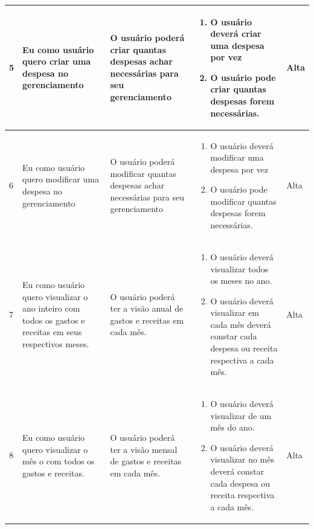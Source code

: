 \begin{longtable}[h!]{ | M{0.5cm} | T{2.7cm} | T{2.7cm} | T{4cm} | l | }
    5 & Eu como usuário quero criar uma despesa no gerenciamento & O usuário poderá criar quantas despesas achar necessárias para seu gerenciamento & \begin{enumerate}
        \item O usuário deverá criar uma despesa por vez
        \item O usuário pode criar quantas despesas forem necessárias.
    \end{enumerate} & Alta \\ \hline

    6 & Eu como usuário quero modificar uma despesa no gerenciamento & O usuário poderá modificar quantas despesas achar necessárias para seu gerenciamento & \begin{enumerate}
        \item O usuário deverá modificar uma despesa por vez
        \item O usuário pode modificar quantas despesas forem necessárias.
    \end{enumerate} & Alta \\ \hline

    7 & Eu como usuário quero visualizar o ano inteiro com todos os gastos e receitas em seus respectivos meses. & O usuário poderá ter a visão anual de gastos e receitas em cada mês. & \begin{enumerate}
        \item O usuário deverá visualizar todos os meses no ano.
        \item O usuário deverá visualizar em cada mês deverá constar cada despesa ou receita respectiva a cada mês.
    \end{enumerate} & Alta \\ \hline

    8 & Eu como usuário quero visualizar o mês o com todos os gastos e receitas. & O usuário poderá ter a visão mensal de gastos e receitas em cada mês. & \begin{enumerate}
        \item O usuário deverá visualizar de um mês do ano.
        \item O usuário deverá visualizar no mês deverá constar cada despesa ou receita respectiva a cada mês.
    \end{enumerate} & Alta \\ \hline

\end{longtable}